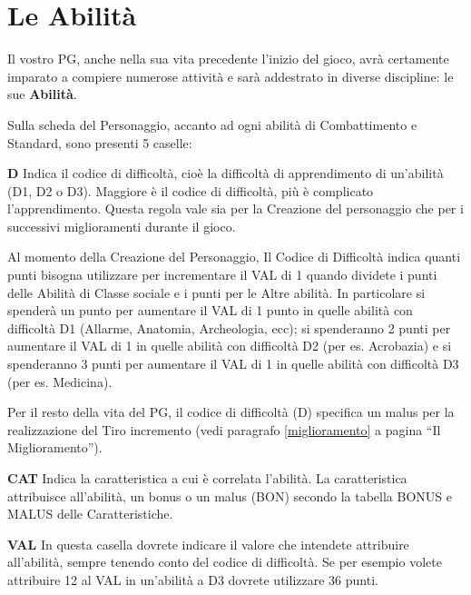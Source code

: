 \section{Le Abilit\`a}
\label{abilita}

Il vostro PG, anche nella sua vita precedente l'inizio del gioco,
avr\`a certamente imparato a compiere numerose attivit\`a e sar\`a
addestrato in diverse discipline: le sue \textbf{Abilit\`a}.

Sulla scheda del Personaggio, accanto ad ogni abilit\`a di
Combattimento e Standard, sono presenti 5 caselle:

\begin{description}
\item{\bf D} Indica il codice di difficolt\`a, cio\`e la
  difficolt\`a di apprendimento di un'abilit\`a (D1, D2 o D3).
  Maggiore \`e il codice di difficolt\`a, pi\`u \`e complicato
  l'apprendimento.  Questa regola vale sia per la Creazione del
  personaggio che per i successivi miglioramenti durante il gioco.
  
  Al momento della Creazione del Personaggio, Il Codice di
  Difficolt\`a indica quanti punti bisogna utilizzare per incrementare
  il VAL di 1 quando dividete i punti delle Abilit\`a di Classe
  sociale e i punti per le Altre abilit\`a. In particolare si
  spender\`a un punto per aumentare il VAL di 1 punto in quelle
  abilit\`a con difficolt\`a D1 (Allarme, Anatomia, Archeologia, ecc);
  si spenderanno 2 punti per aumentare il VAL di 1 in quelle abilit\`a
  con difficolt\`a D2 (per es. Acrobazia) e si spenderanno 3 punti per
  aumentare il VAL di 1 in quelle abilit\`a con difficolt\`a D3 (per
  es. Medicina).
  
  Per il resto della vita del PG, il codice di difficolt\`a (D)
  specifica un malus per la realizzazione del Tiro incremento (vedi
  paragrafo \ref{miglioramento} a pagina \pageref{miglioramento} ``Il
  Miglioramento'').
  
\item{\bf CAT} Indica la caratteristica a cui \`e correlata
  l'abilit\`a. La caratteristica attribuisce all'abilit\`a, un
  bonus o un malus (BON) secondo la tabella BONUS e MALUS delle
  Caratteristiche.
  
\item{\bf VAL} In questa casella dovrete indicare il valore che
  intendete attribuire all'abilit\`a, sempre tenendo conto del
  codice di difficolt\`a. Se per esempio volete attribuire 12 al VAL
  in un'abilit\`a a D3 dovrete utilizzare 36 punti.
  

\end{description}
